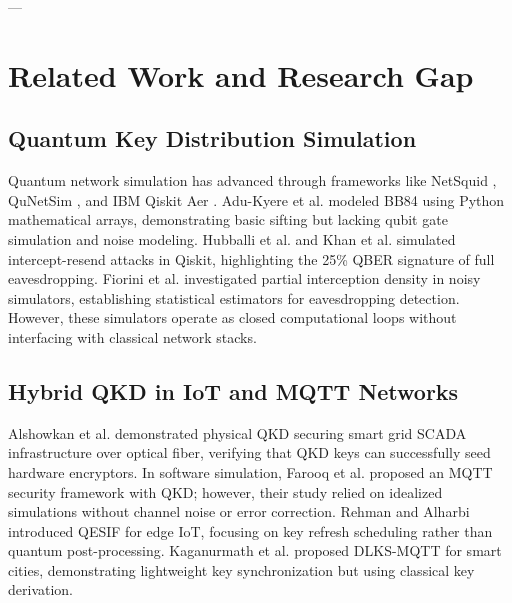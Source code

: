 \documentclass[journal,10pt,twocolumn]{article}
\begin{document}
---

\section{Related Work and Research Gap}
\subsection{Quantum Key Distribution Simulation}
Quantum network simulation has advanced through frameworks like NetSquid \cite{coopmans2021netsquid}, QuNetSim \cite{diadamo2021qunetsim}, and IBM Qiskit Aer \cite{buyukdede2026virtualized, das2026simulating}. Adu-Kyere et al. \cite{adukyere2022quantum} modeled BB84 using Python mathematical arrays, demonstrating basic sifting but lacking qubit gate simulation and noise modeling. Hubballi et al. \cite{hubballi2026noise} and Khan et al. \cite{khan2026simulation} simulated intercept-resend attacks in Qiskit, highlighting the 25\% QBER signature of full eavesdropping. Fiorini et al. \cite{fiorini2024estimating, fiorini2025eavesdropper, fiorini2026characterization} investigated partial interception density in noisy simulators, establishing statistical estimators for eavesdropping detection. However, these simulators operate as closed computational loops without interfacing with classical network stacks.

\subsection{Hybrid QKD in IoT and MQTT Networks}
Alshowkan et al. \cite{alshowkan2022experimental} demonstrated physical QKD securing smart grid SCADA infrastructure over optical fiber, verifying that QKD keys can successfully seed hardware encryptors. In software simulation, Farooq et al. \cite{farooq2024enhanced} proposed an MQTT security framework with QKD; however, their study relied on idealized simulations without channel noise or error correction. Rehman and Alharbi \cite{rehman2025qesif} introduced QESIF for edge IoT, focusing on key refresh scheduling rather than quantum post-processing. Kaganurmath et al. \cite{kaganurmath2025dlks} proposed DLKS-MQTT for smart cities, demonstrating lightweight key synchronization but using classical key derivation.
\end{document}
